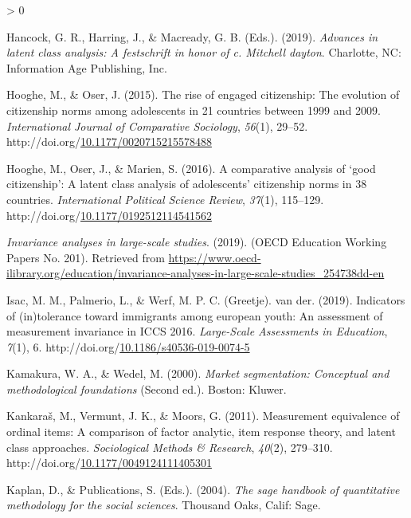 \documentclass[12pt,a4paper,oneside]{reedthesis}
\newlength{\cslhangindent}
\newenvironment{CSLReferences}[2] %
 {%
  \setlength{\parindent}{0pt}
  \ifodd #1 \everypar{\setlength{\hangindent}{\cslhangindent}}\ignorespaces\fi
  \ifnum #2 > 0
  \setlength{\parskip}{#2\baselineskip}
  \fi
 }%
 {}
\begin{document}
\begin{CSLReferences}{1}{0}
\leavevmode\hypertarget{ref-hancock_advances_2019}{}%
Hancock, G. R., Harring, J., \& Macready, G. B. (Eds.). (2019). \emph{Advances in latent class analysis: A festschrift in honor of c. Mitchell dayton}. Charlotte, {NC}: Information Age Publishing, Inc.

\leavevmode\hypertarget{ref-hooghe_rise_2015}{}%
Hooghe, M., \& Oser, J. (2015). The rise of engaged citizenship: The evolution of citizenship norms among adolescents in 21 countries between 1999 and 2009. \emph{International Journal of Comparative Sociology}, \emph{56}(1), 29--52. http://doi.org/\href{https://doi.org/10.1177/0020715215578488}{10.1177/0020715215578488}

\leavevmode\hypertarget{ref-hooghe_comparative_2016}{}%
Hooghe, M., Oser, J., \& Marien, S. (2016). A comparative analysis of {`good citizenship'}: A latent class analysis of adolescents' citizenship norms in 38 countries. \emph{International Political Science Review}, \emph{37}(1), 115--129. http://doi.org/\href{https://doi.org/10.1177/0192512114541562}{10.1177/0192512114541562}

\leavevmode\hypertarget{ref-noauthor_invariance_2019}{}%
\emph{Invariance analyses in large-scale studies}. (2019). (OECD Education Working Papers No. 201). Retrieved from \url{https://www.oecd-ilibrary.org/education/invariance-analyses-in-large-scale-studies_254738dd-en}

\leavevmode\hypertarget{ref-isac_indicators_2019}{}%
Isac, M. M., Palmerio, L., \& Werf, M. P. C. (Greetje). van der. (2019). Indicators of (in)tolerance toward immigrants among european youth: An assessment of measurement invariance in {ICCS} 2016. \emph{Large-Scale Assessments in Education}, \emph{7}(1), 6. http://doi.org/\href{https://doi.org/10.1186/s40536-019-0074-5}{10.1186/s40536-019-0074-5}

\leavevmode\hypertarget{ref-kamakura_market_2000}{}%
Kamakura, W. A., \& Wedel, M. (2000). \emph{Market segmentation: Conceptual and methodological foundations} (Second ed.). Boston: Kluwer.

\leavevmode\hypertarget{ref-kankaras_measurement_2011}{}%
Kankaraš, M., Vermunt, J. K., \& Moors, G. (2011). Measurement equivalence of ordinal items: A comparison of factor analytic, item response theory, and latent class approaches. \emph{Sociological Methods \& Research}, \emph{40}(2), 279--310. http://doi.org/\href{https://doi.org/10.1177/0049124111405301}{10.1177/0049124111405301}

\leavevmode\hypertarget{ref-kaplan_sage_2004}{}%
Kaplan, D., \& Publications, S. (Eds.). (2004). \emph{The sage handbook of quantitative methodology for the social sciences}. Thousand Oaks, Calif: Sage.


\end{CSLReferences}
\end{document}

